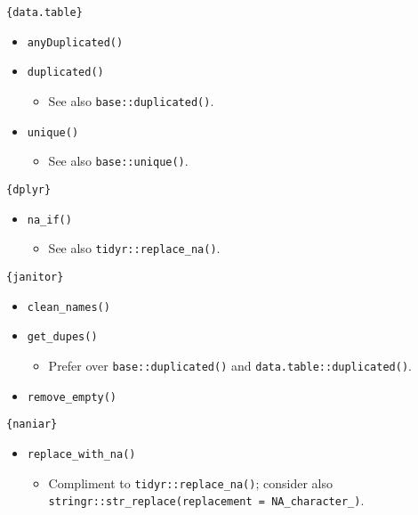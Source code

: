 \documentclass[
]{book}
\providecommand{\tightlist}{%
  \setlength{\itemsep}{0pt}\setlength{\parskip}{0pt}}
\begin{document}
\texttt{\{data.table\}}

\begin{itemize}
\tightlist
\item
  \texttt{anyDuplicated()}
\item
  \texttt{duplicated()}

  \begin{itemize}
  \tightlist
  \item
    See also \texttt{base::duplicated()}.
  \end{itemize}
\item
  \texttt{unique()}

  \begin{itemize}
  \tightlist
  \item
    See also \texttt{base::unique()}.
  \end{itemize}
\end{itemize}

\texttt{\{dplyr\}}

\begin{itemize}
\tightlist
\item
  \texttt{na\_if()}

  \begin{itemize}
  \tightlist
  \item
    See also \texttt{tidyr::replace\_na()}.
  \end{itemize}
\end{itemize}

\texttt{\{janitor\}}

\begin{itemize}
\tightlist
\item
  \texttt{clean\_names()}
\item
  \texttt{get\_dupes()}

  \begin{itemize}
  \tightlist
  \item
    Prefer over \texttt{base::duplicated()} and \texttt{data.table::duplicated()}.
  \end{itemize}
\item
  \texttt{remove\_empty()}
\end{itemize}

\texttt{\{naniar\}}

\begin{itemize}
\tightlist
\item
  \texttt{replace\_with\_na()}

  \begin{itemize}
  \tightlist
  \item
    Compliment to \texttt{tidyr::replace\_na()}; consider also \texttt{stringr::str\_replace(replacement\ =\ NA\_character\_)}.
  \end{itemize}
\end{itemize}
\end{document}

